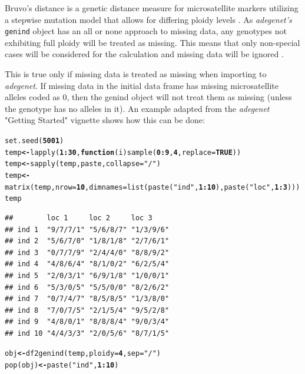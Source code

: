 \documentclass[letterpaper]{article}\usepackage[]{graphicx}\usepackage[]{color}
\makeatletter
\newcommand{\hlnum}[1]{\textcolor[rgb]{0.502,0,0.502}{\textbf{#1}}}%
\newcommand{\hlstr}[1]{\textcolor[rgb]{0.651,0.522,0}{#1}}%
\newcommand{\hlopt}[1]{\textcolor[rgb]{1,0,0.502}{\textbf{#1}}}%
\newcommand{\hlstd}[1]{\textcolor[rgb]{0,0,0}{#1}}%
\newcommand{\hlkwa}[1]{\textcolor[rgb]{0.733,0.475,0.467}{\textbf{#1}}}%
\newcommand{\hlkwb}[1]{\textcolor[rgb]{0.502,0.502,0.753}{\textbf{#1}}}%
\newcommand{\hlkwc}[1]{\textcolor[rgb]{0,0.502,0.753}{#1}}%
\newcommand{\hlkwd}[1]{\textcolor[rgb]{0,0.267,0.4}{#1}}%
\newenvironment{kframe}{%
 \def\at@end@of@kframe{}%
 \ifinner\ifhmode%
  \def\at@end@of@kframe{\end{minipage}}%
  \begin{minipage}{\columnwidth}%
 \fi\fi%
 \def\FrameCommand##1{\hskip\@totalleftmargin \hskip-\fboxsep
 \colorbox{shadecolor}{##1}\hskip-\fboxsep
     \hskip-\linewidth \hskip-\@totalleftmargin \hskip\columnwidth}%
 \MakeFramed {\advance\hsize-\width
   \@totalleftmargin\z@ \linewidth\hsize
   \@setminipage}}%
 {\par\unskip\endMakeFramed%
 \at@end@of@kframe}
\newenvironment{knitrout}{}{} %
\newcommand{\tab}{\hspace*{1em}}
\newcommand{\adegenet}{\textit{adegenet}}
\makeatother
\begin{document}
\tab\tab Bruvo's distance is a genetic distance measure for microsatellite markers utilizing a stepwise mutation model that allows for differing ploidy levels \cite{Bruvo:2004}. As \textit{adegenet's} \texttt{genind} object has an all or none approach to missing data, any genotypes not exhibiting full ploidy will be treated as missing. This means that only non-special cases will be considered for the calculation and missing data will be ignored \cite{Bruvo:2004}.

This is true only if missing data is treated as missing when importing to \adegenet{}. If missing data in the initial data frame has missing microsatellite alleles coded as 0, then the genind object will not treat them as missing (unless the genotype has no alleles in it). An example adapted from the \adegenet{} "Getting Started" vignette shows how this can be done:

\begin{knitrout}\footnotesize
{}\color{fgcolor}\begin{kframe}
\begin{alltt}
\hlkwd{set.seed}\hlstd{(}\hlnum{5001}\hlstd{)}
\hlstd{temp} \hlkwb{<-} \hlkwd{lapply}\hlstd{(}\hlnum{1}\hlopt{:}\hlnum{30}\hlstd{,} \hlkwa{function}\hlstd{(}\hlkwc{i}\hlstd{)} \hlkwd{sample}\hlstd{(}\hlnum{0}\hlopt{:}\hlnum{9}\hlstd{,} \hlnum{4}\hlstd{,} \hlkwc{replace} \hlstd{=} \hlnum{TRUE}\hlstd{))}
\hlstd{temp} \hlkwb{<-} \hlkwd{sapply}\hlstd{(temp, paste,} \hlkwc{collapse} \hlstd{=} \hlstr{"/"}\hlstd{)}
\hlstd{temp} \hlkwb{<-} \hlkwd{matrix}\hlstd{(temp,} \hlkwc{nrow} \hlstd{=} \hlnum{10}\hlstd{,} \hlkwc{dimnames} \hlstd{=} \hlkwd{list}\hlstd{(}\hlkwd{paste}\hlstd{(}\hlstr{"ind"}\hlstd{,} \hlnum{1}\hlopt{:}\hlnum{10}\hlstd{),} \hlkwd{paste}\hlstd{(}\hlstr{"loc"}\hlstd{,} \hlnum{1}\hlopt{:}\hlnum{3}\hlstd{)))}
\hlstd{temp}
\end{alltt}
\begin{verbatim}
##        loc 1     loc 2     loc 3    
## ind 1  "9/7/7/1" "5/6/8/7" "1/3/9/6"
## ind 2  "5/6/7/0" "1/8/1/8" "2/7/6/1"
## ind 3  "0/7/7/9" "2/4/4/0" "8/8/9/2"
## ind 4  "4/8/6/4" "8/1/0/2" "6/2/5/4"
## ind 5  "2/0/3/1" "6/9/1/8" "1/0/0/1"
## ind 6  "5/3/0/5" "5/5/0/0" "8/2/6/2"
## ind 7  "0/7/4/7" "8/5/8/5" "1/3/8/0"
## ind 8  "7/0/7/5" "2/1/5/4" "9/5/2/8"
## ind 9  "4/8/0/1" "8/8/8/4" "9/0/3/4"
## ind 10 "4/4/3/3" "2/0/5/6" "8/7/1/5"
\end{verbatim}
\begin{alltt}
\hlstd{obj} \hlkwb{<-} \hlkwd{df2genind}\hlstd{(temp,} \hlkwc{ploidy} \hlstd{=} \hlnum{4}\hlstd{,} \hlkwc{sep} \hlstd{=} \hlstr{"/"}\hlstd{)}
\hlkwd{pop}\hlstd{(obj)} \hlkwb{<-} \hlkwd{paste}\hlstd{(}\hlstr{"ind"}\hlstd{,} \hlnum{1}\hlopt{:}\hlnum{10}\hlstd{)}
\end{alltt}
\end{kframe}
\end{knitrout}
\end{document}
